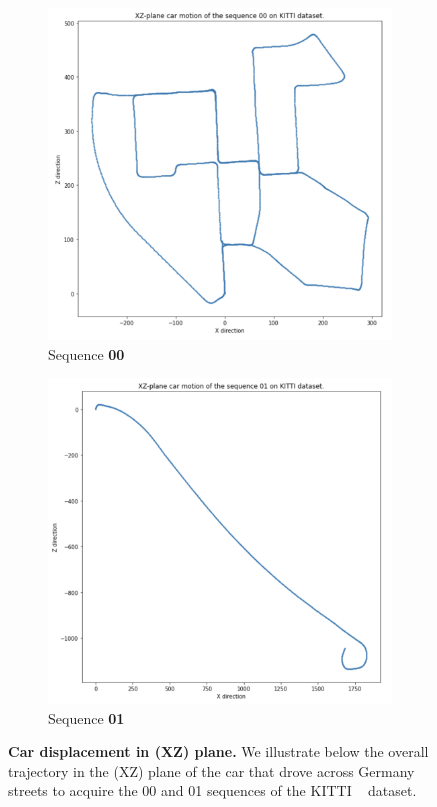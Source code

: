 \begin{figure}[htpb!]
    \centering
    \begin{subfigure}[b]{0.48\linewidth}
      \includegraphics[width=\linewidth]{images/epipolarnvs/XYplaneMotionKITTI.png}
      \caption{Sequence \textbf{00}}
    \end{subfigure}
    \quad %
    \begin{subfigure}[b]{0.48\linewidth}
      \includegraphics[width=\linewidth]{images/epipolarnvs/XYplaneMotionKITTI01.png}
      \caption{Sequence \textbf{01}}
    \end{subfigure}
    \caption{\textbf{Car displacement in (XZ) plane.} We illustrate below the overall trajectory in the (XZ) plane of the car that drove across Germany streets to acquire the 00 and 01 sequences of the KITTI ~\citep{geiger2012we} dataset.}
    \label{fig:test}
  \end{figure}

